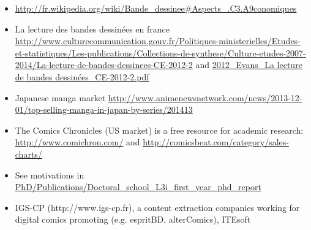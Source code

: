 \begin{itemize}
	\item \url{http://fr.wikipedia.org/wiki/Bande_dessinee#Aspects_.C3.A9conomiques}
	\item La lecture des bandes dessinées en france \url{http://www.culturecommunication.gouv.fr/Politiques-ministerielles/Etudes-et-statistiques/Les-publications/Collections-de-synthese/Culture-etudes-2007-2014/La-lecture-de-bandes-dessinees-CE-2012-2} and \url{2012_Evans_La lecture de bandes dessinées_CE-2012-2.pdf}
	\item Japanese manga market \url{http://www.animenewsnetwork.com/news/2013-12-01/top-selling-manga-in-japan-by-series/201413}
	\item The Comics Chronicles (US market) is a free resource for academic research: \url{http://www.comichron.com/} and \url{http://comicsbeat.com/category/sales-charts/}
	\item See motivations in \url{PhD/Publications/Doctoral_school_L3i_first_year_phd_report}
	\item IGS-CP (http://www.igs-cp.fr), a content extraction companies working for digital comics promoting (e.g. espritBD, alterComics), ITEsoft

\end{itemize}

